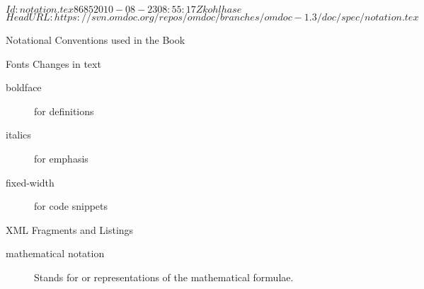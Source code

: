 \svnInfo $Id: notation.tex 8685 2010-08-23 08:55:17Z kohlhase $
\svnKeyword $HeadURL: https://svn.omdoc.org/repos/omdoc/branches/omdoc-1.3/doc/spec/notation.tex $

\begin{tchapter}[id=notation]{Notational Conventions used in the Book}

\begin{tsection}[id=notation:fonts]{Fonts Changes in text}
  \begin{description}
  \item[boldface] for definitions
  \item[italics] for emphasis
  \item[fixed-width] for code snippets
  \end{description}
\end{tsection}

\begin{tsection}[id=notation:xml]{XML Fragments and Listings}
  \begin{description}
  \item[mathematical notation] Stands for {\openmath} or {\cmathml} representations of the
    mathematical formulae.
  \end{description}
\end{tsection}
\end{tchapter}
